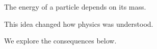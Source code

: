 \documentclass{article}
\begin{document}
The energy of a particle depends on its mass.

This idea changed how physics was understood.

We explore the consequences below.
\end{document}
